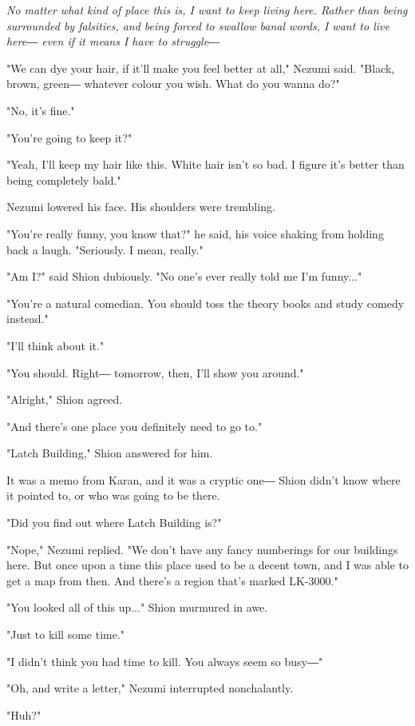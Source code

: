 \emph{No matter what kind of place this is, I want to keep living here. Rather
than being surrounded by falsities, and being forced to swallow banal
words, I want to live here― even if it means I have to struggle―}

"We can dye your hair, if it'll make you feel better at all," Nezumi
said. "Black, brown, green― whatever colour you wish. What do you wanna
do?"

"No, it's fine."

"You're going to keep it?"

"Yeah, I'll keep my hair like this. White hair isn't so bad. I figure
it's better than being completely bald."

Nezumi lowered his face. His shoulders were trembling.

"You're really funny, you know that?" he said, his voice shaking from
holding back a laugh. "Seriously. I mean, really."

"Am I?" said Shion dubiously. "No one's ever really told me I'm
funny..."

"You're a natural comedian. You should toss the theory books and study
comedy instead."

"I'll think about it."

"You should. Right― tomorrow, then, I'll show you around."

"Alright," Shion agreed.

"And there's one place you definitely need to go to."

"Latch Building," Shion answered for him.


It was a memo from Karan, and it was a cryptic one― Shion didn't know
where it pointed to, or who was going to be there.

"Did you find out where Latch Building is?"

"Nope," Nezumi replied. "We don't have any fancy numberings for our
buildings here. But once upon a time this place used to be a decent
town, and I was able to get a map from then. And there's a region that's
marked LK-3000."

"You looked all of this up..." Shion murmured in awe.

"Just to kill some time."

"I didn't think you had time to kill. You always seem so busy―"

"Oh, and write a letter," Nezumi interrupted nonchalantly.

"Huh?"

